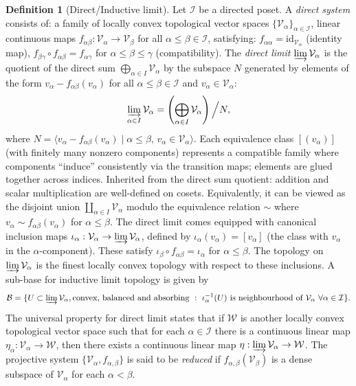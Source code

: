 \documentclass[10pt]{article}
\theoremstyle{definition}
\newtheorem{definition}{Definition}[section]
\begin{document}
	\begin{definition}[Direct/Inductive limit]
		Let $\mathcal I$ be a directed poset. A \emph{direct system} consists of:
		a family of locally convex topological vector spaces $\{\mathcal{V}_\alpha\}_{\alpha\in \mathcal I}$, linear continuous maps $f_{\alpha\beta}: \mathcal{V}_\alpha \to \mathcal{V}_\beta$ for all $\alpha \leq \beta \in \mathcal I$, satisfying: $f_{\alpha\alpha} = \mathrm{id}_{\mathcal{V}_\alpha}$ (identity map), $f_{\beta\gamma} \circ f_{\alpha\beta} = f_{\alpha\gamma}$ for $\alpha \leq \beta \leq \gamma$ (compatibility). 		
		The \emph{direct limit} $\varinjlim \mathcal{V}_\alpha$ is the quotient of the direct sum $\bigoplus_{\alpha \in I} \mathcal{V}_\alpha$ by the subspace $N$ generated by elements of the form $v_\alpha - f_{\alpha\beta}(v_\alpha)$ for all $\alpha \leq \beta \in \mathcal I$ and $v_\alpha \in \mathcal{V}_\alpha$:
		\[
		\varinjlim_{\alpha \in I} \mathcal{V}_\alpha = \left( \bigoplus_{\alpha \in I} \mathcal{V}_\alpha \right) \Big/ N,
		\]
		where $N = \langle v_\alpha - f_{\alpha\beta}(v_\alpha) \mid \alpha \leq \beta, \, v_\alpha \in \mathcal{V}_\alpha \rangle$.
		Each equivalence class $[ (v_\alpha) ]$ (with finitely many nonzero components) represents a compatible family where components ``induce'' consistently via the transition maps; elements are glued together across indices. Inherited from the direct sum quotient: addition and scalar multiplication are well-defined on cosets. Equivalently, it can be viewed as the disjoint union $\coprod_{\alpha \in I} \mathcal{V}_\alpha$ modulo the equivalence relation $\sim$ where $v_\alpha \sim f_{\alpha\beta}(v_\alpha)$ for $\alpha \leq \beta$. The direct limit comes equipped with canonical inclusion maps $\iota_\alpha: \mathcal{V}_\alpha \to \varinjlim \mathcal{V}_\alpha$, defined by $\iota_\alpha(v_\alpha) = [v_\alpha]$ (the class with $v_\alpha$ in the $\alpha$-component). These satisfy $\iota_\beta \circ f_{\alpha\beta} = \iota_\alpha$ for $\alpha \leq \beta$. The topology on $\varinjlim\mathcal V_\alpha$ is the finest locally convex topology with respect to these inclusions. A sub-base for inductive limit topology is given by
		$$\mathcal B=\{U\subset \varinjlim\mathcal V_\alpha, \text{convex, balanced and absorbing}~:~\iota_\alpha^{-1}(U)~\text{is neighbourhood of~} \mathcal V_\alpha~\forall \alpha\in \mathcal I\}.$$ The universal property for direct limit states that if $\mathcal W$ is another locally convex topological vector space such that for each $\alpha\in \mathcal I$ there is a continuous linear map $\eta_\alpha:\mathcal V_\alpha\to \mathcal W$, then there exists a continuous linear map $\eta:\varinjlim \mathcal V_\alpha\to \mathcal W$. The projective system $\{\mathcal V_\alpha, f_{\alpha,\beta}\}$ is said to be \emph{reduced} if $f_{\alpha,\beta}(\mathcal V_\beta)$ is a dense subspace of $\mathcal V_\alpha$ for each $\alpha<\beta$.
	\end{definition}
\end{document}
